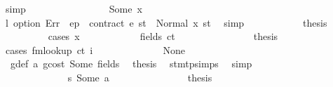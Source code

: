 \begin{isabellebody}
\ simp\isanewline
\ \ \ \ \ \ \isamarkupfalse%
\isanewline
\ \ \ \ \ \ \ \ \isamarkupfalse%
\ {\isacharparenleft}{\kern0pt}Some\ x{\isacharparenright}{\kern0pt}\isanewline
\ \ \ \ \ \ \ \ \isamarkupfalse%
\ \isamarkupfalse%
\ l{}{\isacharcolon}{\kern0pt}\ {\isachardoublequoteopen}option\ Err\ {\isacharparenleft}{\kern0pt}{\isasymlambda}{\isacharunderscore}{\kern0pt}{\isachardot}{\kern0pt}\ ep\ {\isachardollar}{\kern0pt}{\isachardollar}{\kern0pt}\ contract\ e{\isacharparenright}{\kern0pt}\ st{\isacharprime}{\kern0pt}\ {\isacharequal}{\kern0pt}\ Normal\ {\isacharparenleft}{\kern0pt}x{\isacharcomma}{\kern0pt}\ st{\isacharprime}{\kern0pt}{\isacharparenright}{\kern0pt}{\isachardoublequoteclose}\ \isamarkupfalse%
\ simp\isanewline
\ \ \ \ \ \ \ \ \isamarkupfalse%
\ \isamarkupfalse%
\ {\isacharquery}{\kern0pt}thesis\isanewline
\ \ \ \ \ \ \ \ \isamarkupfalse%
\ {\isacharparenleft}{\kern0pt}cases\ x{\isacharparenright}{\kern0pt}\isanewline
\ \ \ \ \ \ \ \ \ \ \isamarkupfalse%
\ {\isacharparenleft}{\kern0pt}fields\ ct\ {\isacharunderscore}{\kern0pt}\ {\isacharunderscore}{\kern0pt}{\isacharparenright}{\kern0pt}\isanewline
\ \ \ \ \ \ \ \ \ \ \isamarkupfalse%
\ \isamarkupfalse%
\ {\isacharquery}{\kern0pt}thesis\isanewline
\ \ \ \ \ \ \ \ \ \ \isamarkupfalse%
\ {\isacharparenleft}{\kern0pt}cases\ {\isachardoublequoteopen}fmlookup\ ct\ i{\isachardoublequoteclose}{\isacharparenright}{\kern0pt}\isanewline
\ \ \ \ \ \ \ \ \ \ \ \ \isamarkupfalse%
\ None\isanewline
\ \ \ \ \ \ \ \ \ \ \ \ \isamarkupfalse%
\ {}{\isacharparenleft}{\kern0pt}{}{\isacharparenright}{\kern0pt}\ g{\isacharunderscore}{\kern0pt}def\ a{}\ gcost\ Some\ fields\ \isamarkupfalse%
\ {\isacharquery}{\kern0pt}thesis\ \isamarkupfalse%
\ stmt{\isachardot}{\kern0pt}psimps{\isacharparenleft}{\kern0pt}{}{\isacharparenright}{\kern0pt}\ \isamarkupfalse%
\ simp\isanewline
\ \ \ \ \ \ \ \ \ \ \isamarkupfalse%
\isanewline
\ \ \ \ \ \ \ \ \ \ \ \ \isamarkupfalse%
\ s{}{\isacharcolon}{\kern0pt}\ {\isacharparenleft}{\kern0pt}Some\ a{\isacharparenright}{\kern0pt}\isanewline
\ \ \ \ \ \ \ \ \ \ \ \ \isamarkupfalse%
\ \isamarkupfalse%
\ {\isacharquery}{\kern0pt}thesis\isanewline
\ \ \ \ \ \ \ \ \ \ \ \ \isamarkupfalse%

\end{isabellebody}
